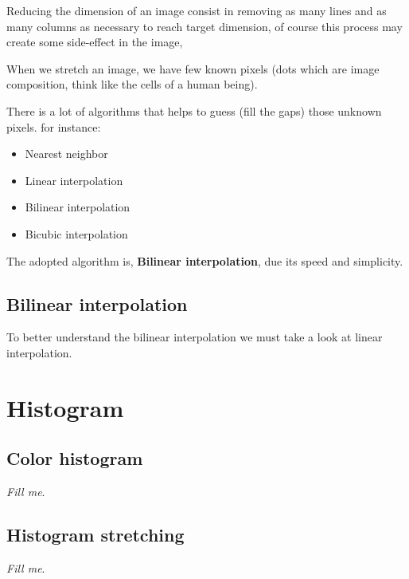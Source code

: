 \documentclass{report}
\begin{document}
	Reducing the dimension of an image consist in removing as many lines and as many columns as necessary to reach target dimension, of course this
	process may create some side-effect in the image, 

	When we stretch an image, we have few known pixels (dots which are image composition, think like the cells of a human being).

	There is a lot of algorithms that helps to guess (fill the gaps) those unknown pixels. for instance:

	\begin{itemize}
	  \item Nearest neighbor
	  \item Linear interpolation
	  \item Bilinear interpolation
	  \item Bicubic interpolation
	\end{itemize}

	The adopted algorithm is, \textbf{Bilinear interpolation},  due its speed and simplicity.
	
	\subsection{Bilinear interpolation}

	To better understand the bilinear interpolation we must take a look at linear interpolation.
	
	

\section{Histogram}

	\subsection{Color histogram}

		\textit{Fill me}.

	\subsection{Histogram stretching}

		\textit{Fill me}.
\end{document}
